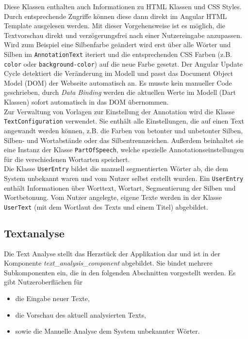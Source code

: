 Diese Klassen enthalten auch Informationen zu HTML Klassen und CSS Styles. Durch entsprechende Zugriffe können diese dann direkt im Angular HTML Template ausgelesen werden. Mit dieser Vorgehensweise ist es möglich, die Textvorschau direkt und verzögerungsfrei nach einer Nutzereingabe anzupassen. Wird zum Beispiel eine Silbenfarbe geändert wird erst über alle Wörter und Silben im \texttt{AnnotationText} iteriert und die entsprechenden CSS Farben (z.B. \texttt{color} oder \texttt{background-color}) auf die neue Farbe gesetzt. Der Angular Update Cycle  detektiert die Veränderung im Modell und passt das Document Object Model (DOM) der Webseite automatisch an. Es musste kein manueller Code geschrieben, durch \textit{Data Binding} werden die aktuellen Werte im Modell (Dart Klassen) sofort automatisch in das DOM übernommen.\\

Zur Verwaltung von Vorlagen zur Einstellung der Annotation wird die Klasse \texttt{TextConfiguration} verwendet. Sie enthält alle Einstellungen, die auf einen Text angewandt werden können, z.B. die Farben von betonter und unbetonter Silben, Silben- und Wortabstände oder das Silbentrennzeichen. Außerdem beinhaltet sie eine Instanz der Klasse \texttt{PartOfSpeech}, welche spezielle Annotationseinstellungen für die verschiedenen Wortarten speichert.
\\

Die Klasse \texttt{UserEntry} bildet die manuell segmentierten Wörter ab, die dem System unbekannt waren und vom Nutzer selbst erstellt wurden. Ein \texttt{UserEntry} enthält Informationen über Worttext, Wortart, Segmentierung der Silben und Wortbetonung. Vom Nutzer angelegte, eigene Texte werden in der Klasse \texttt{UserText} (mit dem Wortlaut des Texts und einem Titel) abgebildet.

\subsection{Textanalyse}

Die Text Analyse stellt das Herzstück der Applikation dar und ist in der Komponente \textit{text\_analysis\_component} abgebildet. Sie bindet mehrere Subkomponenten ein, die in den folgenden Abschnitten vorgestellt werden. Es gibt Nutzeroberflächen für
\begin{itemize}
	\item die Eingabe neuer Texte,
	\item die Vorschau des aktuell analysierten Texts,
	\item sowie die Manuelle Analyse dem System unbekannter Wörter.
\end{itemize}

